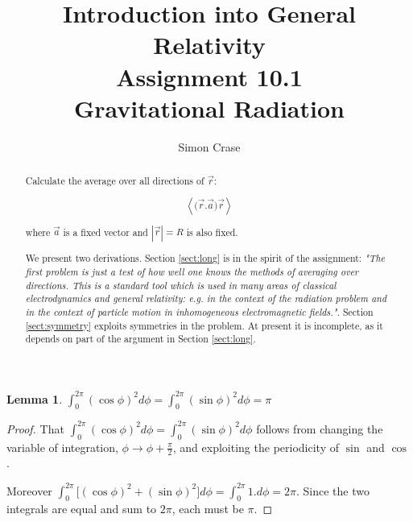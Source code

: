 \documentclass[]{article}
\title{Introduction into General Relativity\\Assignment 10.1\\Gravitational Radiation}
\author{Simon Crase}
\newtheorem{lemma}{Lemma}
\begin{document}
\maketitle

\begin{abstract}
	Calculate the average over all directions of $\vec{r}$:
	
	$$\left\langle \big(\vec{r}.\vec{a}\big)\vec{r} \right\rangle$$
	
	where $\vec{a}$ is a fixed vector and $|\vec{r}|=R$ is also fixed.
	
	We present two derivations. Section \ref{sect:long} is in the spirit of the assignment: \emph{"The first problem is just a test of how well one knows the methods of averaging over directions. This is a standard tool which is used in many areas of classical electrodynamics and general relativity: e.g. in the context of the radiation problem and in the context of particle motion in inhomogeneous electromagnetic fields."}. Section \ref{sect:symmetry}  exploits symmetries in the problem. At present it is incomplete, as it depends on part of the argument in Section \ref{sect:long}.
\end{abstract}

\begin{lemma}\label{lemma:i1}
	$\int_{0}^{2\pi}(\cos\phi)^2  d\phi = \int_{0}^{2\pi}(\sin\phi)^2  d\phi=\pi$
\end{lemma}
\begin{proof}
	That $\int_{0}^{2\pi}(\cos\phi)^2  d\phi = \int_{0}^{2\pi}(\sin\phi)^2  d\phi$ follows from changing the variable of integration, $\phi\rightarrow\phi+\frac{\pi}{2}$, and exploiting the periodicity of $\sin$ and $\cos$. 
	
	Moreover $\int_{0}^{2\pi}\big[(\cos\phi)^2  +(\sin\phi)^2\big] d\phi=\int_{0}^{2\pi}1. d\phi=2\pi$. Since the two integrals are equal and sum to $2\pi$, each must be $\pi$.
\end{proof}
\end{document}
